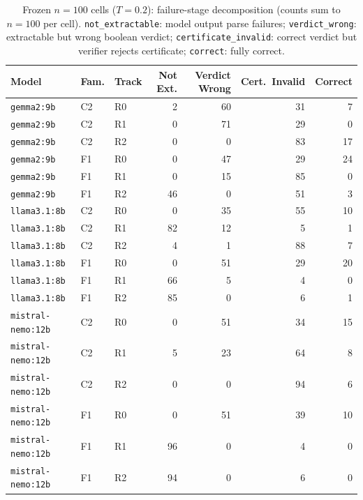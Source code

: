 \begin{table}[tbp]
  \centering
  \caption{Frozen $n{=}100$ cells ($T{=}0.2$): failure-stage decomposition (counts sum to $n{=}100$ per cell). \texttt{not\_extractable}: model output parse failures; \texttt{verdict\_wrong}: extractable but wrong boolean verdict; \texttt{certificate\_invalid}: correct verdict but verifier rejects certificate; \texttt{correct}: fully correct.}
  \label{tab:failure-stage-n100}
  \setlength{\tabcolsep}{4pt}
  \begin{tabular*}{\textwidth}{@{\extracolsep{\fill}} l l l r r r r @{}}
    \toprule
    Model & Fam. & Track & Not Ext. & Verdict Wrong & Cert.\ Invalid & Correct \\
    \midrule
    \texttt{gemma2:9b} & C2 & R0 & 2 & 60 & 31 & 7 \\
    \texttt{gemma2:9b} & C2 & R1 & 0 & 71 & 29 & 0 \\
    \texttt{gemma2:9b} & C2 & R2 & 0 & 0 & 83 & 17 \\
    \texttt{gemma2:9b} & F1 & R0 & 0 & 47 & 29 & 24 \\
    \texttt{gemma2:9b} & F1 & R1 & 0 & 15 & 85 & 0 \\
    \texttt{gemma2:9b} & F1 & R2 & 46 & 0 & 51 & 3 \\
    \texttt{llama3.1:8b} & C2 & R0 & 0 & 35 & 55 & 10 \\
    \texttt{llama3.1:8b} & C2 & R1 & 82 & 12 & 5 & 1 \\
    \texttt{llama3.1:8b} & C2 & R2 & 4 & 1 & 88 & 7 \\
    \texttt{llama3.1:8b} & F1 & R0 & 0 & 51 & 29 & 20 \\
    \texttt{llama3.1:8b} & F1 & R1 & 66 & 5 & 4 & 0 \\
    \texttt{llama3.1:8b} & F1 & R2 & 85 & 0 & 6 & 1 \\
    \texttt{mistral-nemo:12b} & C2 & R0 & 0 & 51 & 34 & 15 \\
    \texttt{mistral-nemo:12b} & C2 & R1 & 5 & 23 & 64 & 8 \\
    \texttt{mistral-nemo:12b} & C2 & R2 & 0 & 0 & 94 & 6 \\
    \texttt{mistral-nemo:12b} & F1 & R0 & 0 & 51 & 39 & 10 \\
    \texttt{mistral-nemo:12b} & F1 & R1 & 96 & 0 & 4 & 0 \\
    \texttt{mistral-nemo:12b} & F1 & R2 & 94 & 0 & 6 & 0 \\

\end{tabular*}
\end{table}
